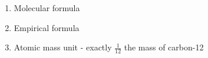 \documentclass[10pt,a4paper, landscape]{report}
\begin{document}
	\begin{multicols*}{3}
	 \begin{enumerate}
	 	\item Molecular formula
	 	\item Empirical formula
	 	\item Atomic mass unit - exactly $ \tfrac{1}{12}  $ the mass of carbon-12
	 \end{enumerate}
	\end{multicols*}
\end{document}
